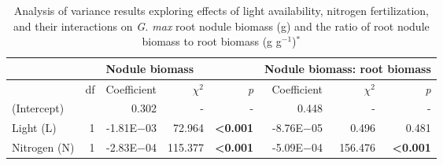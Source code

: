 \newpage
\begin{landscape}
\begin{table}
    \caption[Analysis of variance results exploring effects of light availability, nitrogen fertilization, and their interactions on \textit{G. max} root nodule biomass and the ratio of root nodule biomass to root biomass]{Analysis of variance results exploring effects of light availability, nitrogen fertilization, and their interactions on \textit{G. max} root nodule biomass (g) and the ratio of root nodule biomass to root biomass (g g$^{-1}$)$^*$}
    \centering
    \begin{tabular}{p{2.4cm}p{0.5cm}p{2cm}p{1.5cm}p{1.5cm}p{2cm}p{1.5cm}p{1.5cm}}
        && 
        \multicolumn{3}{l}{Nodule biomass} 
        & \multicolumn{3}{l}{Nodule biomass: root biomass} 
        \\
        \hline
        & \multicolumn{1}{r}{df}
        & \multicolumn{1}{r}{Coefficient}   & \multicolumn{1}{r}{$\chi^{2}$}        & \multicolumn{1}{r}{\textit{p}}
        & \multicolumn{1}{r}{Coefficient}   & \multicolumn{1}{r}{$\chi^{2}$}        & \multicolumn{1}{r}{\textit{p}}
        \\
        \hline
        
        (Intercept)
        && \multicolumn{1}{r}{0.302}        & \multicolumn{1}{r}{-}                 & \multicolumn{1}{r}{-}
        & \multicolumn{1}{r}{0.448}         & \multicolumn{1}{r}{-}                 & \multicolumn{1}{r}{-} 
        \\
    
        Light (L) & \multicolumn{1}{r}{1}
        & \multicolumn{1}{r}{-1.81E$-$03}     & \multicolumn{1}{r}{72.964}            & \multicolumn{1}{r}{\textbf{<0.001}}
        & \multicolumn{1}{r}{-8.76E$-$05}     & \multicolumn{1}{r}{0.496}             & \multicolumn{1}{r}{0.481} 
        \\
    
        Nitrogen (N) & \multicolumn{1}{r}{1}
        & \multicolumn{1}{r}{-2.83E$-$04}     & \multicolumn{1}{r}{115.377}           & \multicolumn{1}{r}{\textbf{<0.001}}
        & \multicolumn{1}{r}{-5.09E$-$04}     & \multicolumn{1}{r}{156.476}           & \multicolumn{1}{r}{\textbf{<0.001}} 
        \\
    

\end{tabular}
\end{table}
\end{landscape}
